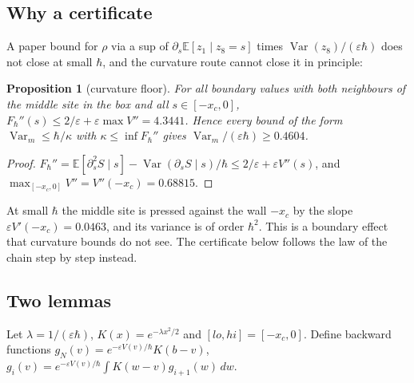 \documentclass[11pt,a4paper]{article}
\newtheorem{proposition}[theorem]{Proposition}
\theoremstyle{definition}
\theoremstyle{remark}
\newcommand{\E}{\mathbb{E}}
\newcommand{\Var}{\operatorname{Var}}
\newcommand{\xc}{x_c}
\begin{document}
\subsection{Why a certificate}
A paper bound for $\rho$ via a sup of $\partial_s\E[z_1\mid z_8=s]$ times $\Var(z_8)/(\varepsilon\hbar)$ does not close at small $\hbar$, and the curvature route cannot close it in principle:

\begin{proposition}[curvature floor]\label{prop:N1}
For all boundary values with both neighbours of the middle site in the box and all $s\in[-\xc,0]$, $F_\hbar''(s)\le2/\varepsilon+\varepsilon\max V''=4.3441$. Hence every bound of the form $\Var_m\le\hbar/\kappa$ with $\kappa\le\inf F_\hbar''$ gives $\Var_m/(\varepsilon\hbar)\ge0.4604$.
\end{proposition}
\begin{proof}
$F_\hbar''=\E[\partial_s^2S\mid s]-\Var(\partial_sS\mid s)/\hbar\le2/\varepsilon+\varepsilon V''(s)$, and $\max_{[-\xc,0]}V''=V''(-\xc)=0.68815$.
\end{proof}
At small $\hbar$ the middle site is pressed against the wall $-\xc$ by the slope $\varepsilon V'(-\xc)=0.0463$, and its variance is of order $\hbar^2$. This is a boundary effect that curvature bounds do not see. The certificate below follows the law of the chain step by step instead.

\subsection{Two lemmas}
Let $\lambda=1/(\varepsilon\hbar)$, $K(x)=e^{-\lambda x^2/2}$ and $[lo,hi]=[-\xc,0]$. Define backward functions $g_N(v)=e^{-\varepsilon V(v)/\hbar}K(b-v)$, $g_i(v)=e^{-\varepsilon V(v)/\hbar}\int K(w-v)g_{i+1}(w)\,dw$.
\end{document}
